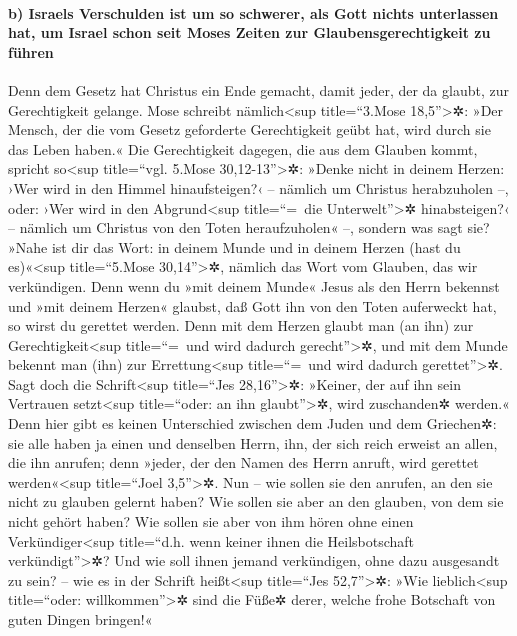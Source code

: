 \hypertarget{b-israels-verschulden-ist-um-so-schwerer-als-gott-nichts-unterlassen-hat-um-israel-schon-seit-moses-zeiten-zur-glaubensgerechtigkeit-zu-fuxfchren}{%
\paragraph{b) Israels Verschulden ist um so schwerer, als Gott nichts
unterlassen hat, um Israel schon seit Moses Zeiten zur
Glaubensgerechtigkeit zu
führen}\label{b-israels-verschulden-ist-um-so-schwerer-als-gott-nichts-unterlassen-hat-um-israel-schon-seit-moses-zeiten-zur-glaubensgerechtigkeit-zu-fuxfchren}}

 Denn dem Gesetz hat Christus ein Ende gemacht, damit
jeder, der da glaubt, zur Gerechtigkeit gelange.  Mose
schreibt nämlich\textless sup title=``3.Mose 18,5''\textgreater✲: »Der
Mensch, der die vom Gesetz geforderte Gerechtigkeit geübt hat, wird
durch sie das Leben haben.«  Die Gerechtigkeit dagegen,
die aus dem Glauben kommt, spricht so\textless sup title=``vgl. 5.Mose
30,12-13''\textgreater✲: »Denke nicht in deinem Herzen: ›Wer wird in den
Himmel hinaufsteigen?‹ -- nämlich um Christus herabzuholen --,
 oder: ›Wer wird in den Abgrund\textless sup title=``=~die
Unterwelt''\textgreater✲ hinabsteigen?‹ -- nämlich um Christus von den
Toten heraufzuholen« --,  sondern was sagt sie? »Nahe ist
dir das Wort: in deinem Munde und in deinem Herzen (hast du
es)«\textless sup title=``5.Mose 30,14''\textgreater✲, nämlich das Wort
vom Glauben, das wir verkündigen.  Denn wenn du »mit
deinem Munde« Jesus als den Herrn bekennst und »mit deinem Herzen«
glaubst, daß Gott ihn von den Toten auferweckt hat, so wirst du gerettet
werden.  Denn mit dem Herzen glaubt man (an ihn) zur
Gerechtigkeit\textless sup title=``=~und wird dadurch
gerecht''\textgreater✲, und mit dem Munde bekennt man (ihn) zur
Errettung\textless sup title=``=~und wird dadurch
gerettet''\textgreater✲.  Sagt doch die
Schrift\textless sup title=``Jes 28,16''\textgreater✲: »Keiner, der auf
ihn sein Vertrauen setzt\textless sup title=``oder: an ihn
glaubt''\textgreater✲, wird zuschanden✲ werden.«  Denn
hier gibt es keinen Unterschied zwischen dem Juden und dem Griechen✲:
sie alle haben ja einen und denselben Herrn, ihn, der sich reich erweist
an allen, die ihn anrufen;  denn »jeder, der den Namen
des Herrn anruft, wird gerettet werden«\textless sup title=``Joel
3,5''\textgreater✲.  Nun -- wie sollen sie den anrufen,
an den sie nicht zu glauben gelernt haben? Wie sollen sie aber an den
glauben, von dem sie nicht gehört haben? Wie sollen sie aber von ihm
hören ohne einen Verkündiger\textless sup title=``d.h. wenn keiner ihnen
die Heilsbotschaft verkündigt''\textgreater✲?  Und wie
soll ihnen jemand verkündigen, ohne dazu ausgesandt zu sein? -- wie es
in der Schrift heißt\textless sup title=``Jes 52,7''\textgreater✲: »Wie
lieblich\textless sup title=``oder: willkommen''\textgreater✲ sind die
Füße✲ derer, welche frohe Botschaft von guten Dingen bringen!«

